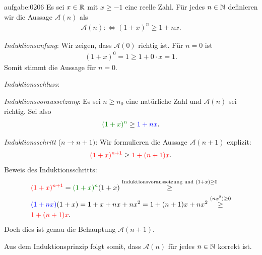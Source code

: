\begin{antwort}{aufgabe:0206}
Es sei $x\in\mathbb{R}$ mit $x\geq -1$ eine reelle Zahl. Für jedes $n\in\mathbb{N}$ definieren wir die Aussage $\mathcal{A}(n)$ als
\begin{align*}
    \mathcal{A}(n) :\iff (1+x)^n\geq 1+nx.
\end{align*}
\begin{aenum}
    \item \textit{Induktionsanfang}: Wir zeigen, dass $\mathcal{A}(0)$ richtig ist. Für $n=0$ ist
    \begin{align*}
        (1+x)^0 = 1 \geq 1 + 0\cdot x = 1.
    \end{align*}
    Somit stimmt die Aussage für $n=0$.
    \item \textit{Induktionsschluss}:
        \begin{renum}
            \item \textit{Induktionsvoraussetzung}: Es sei $n\geq n_0$ eine natürliche Zahl und $\mathcal{A}(n)$ sei richtig. Sei also
            \begin{align*}
                \textcolor{Green}{(1+x)^n} \geq \textcolor{Blue}{1+nx}.
            \end{align*}
            \item \textit{Induktionsschritt} ($n\to n+1)$: Wir formulieren die Aussage $\mathcal{A}(n+1)$ explizit:
            \begin{align*}
                \textcolor{Red}{(1+x)^{n+1}} \geq \textcolor{Red}{1 + (n+1)x}.
            \end{align*}
            Beweis des Induktionsschritts:
            \begin{align*}
                &\textcolor{Red}{(1+x)^{n+1}} = \textcolor{Green}{(1+x)^n} (1+x) \stackrel{\text{Induktionsvoraussetzung und }(1+x)\geq 0}{\geq}\\
                &\textcolor{Blue}{(1+nx)}(1+x) = 1+x+nx+nx^2 = 1+(n+1)x + nx^2 \stackrel{(nx^2)\geq 0}{\geq}\\
                &\textcolor{Red}{1 + (n+1)x}.
            \end{align*}
        Doch dies ist genau die Behauptung $\mathcal{A}(n+1)$.
        \end{renum}
\end{aenum}
Aus dem Induktionsprinzip folgt somit, dass $\mathcal{A}(n)$ für jedes $n\in\mathbb{N}$ korrekt ist.
\end{antwort}


